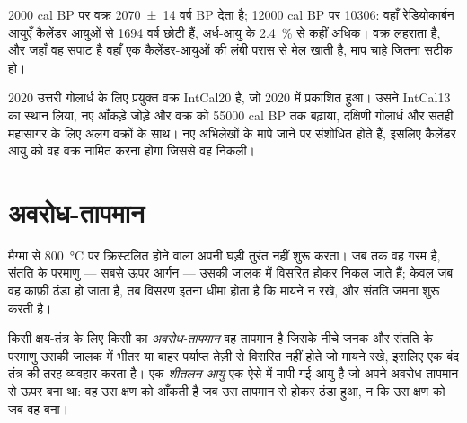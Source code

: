 \num{2000} cal BP पर वक्र \num[uncertainty-mode=separate]{2070 \pm 14} वर्ष BP देता है; \num{12000} cal BP पर \num{10306}: वहाँ रेडियोकार्बन आयुएँ कैलेंडर आयुओं से \num{1694} वर्ष छोटी हैं, अर्ध-आयु के \qty{2.4}{\percent} से कहीं अधिक। वक्र लहराता है, और जहाँ वह सपाट है वहाँ एक  कैलेंडर-आयुओं की लंबी परास से मेल खाती है, माप चाहे जितना सटीक हो।

\begin{dated}{2020}
उत्तरी गोलार्ध के लिए प्रयुक्त वक्र IntCal20 है, जो 2020 में प्रकाशित हुआ। उसने IntCal13 का स्थान लिया, नए आँकड़े जोड़े और वक्र को \num{55000} cal BP तक बढ़ाया, दक्षिणी गोलार्ध और सतही महासागर के लिए अलग वक्रों के साथ।  नए अभिलेखों के मापे जाने पर संशोधित होते हैं, इसलिए कैलेंडर आयु को वह वक्र नामित करना होगा जिससे वह निकली।
\end{dated}

\section{अवरोध-तापमान}\label{sec:b1:radiometric-methods:closure}

मैग्मा से \qty{800}{\celsius} पर क्रिस्टलित होने वाला  अपनी घड़ी तुरंत नहीं शुरू करता। जब तक वह गरम है, संतति के परमाणु --- सबसे ऊपर आर्गन --- उसकी जालक में विसरित होकर निकल जाते हैं; केवल जब वह काफ़ी ठंडा हो जाता है, तब विसरण इतना धीमा होता है कि मायने न रखे, और संतति जमना शुरू करती है।

\begin{definition}\label{def:b1:radiometric-methods:closure}
किसी क्षय-तंत्र के लिए किसी  का \emph{अवरोध-तापमान} वह तापमान है जिसके नीचे जनक और संतति के परमाणु उसकी जालक में भीतर या बाहर पर्याप्त तेज़ी से विसरित नहीं होते जो मायने रखे, इसलिए  एक बंद तंत्र की तरह व्यवहार करता है। एक \emph{शीतलन-आयु} एक ऐसे  में मापी गई आयु है जो अपने अवरोध-तापमान से ऊपर बना था: वह उस क्षण को आँकती है जब  उस तापमान से होकर ठंडा हुआ, न कि उस क्षण को जब वह बना।
\end{definition}

